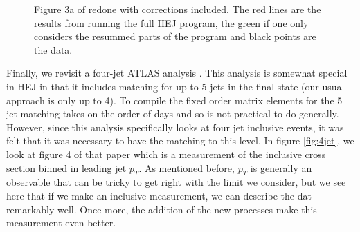 \begin{figure}[t]
\caption{Figure 3a of \cite{Aad2014} redone with corrections included. The red lines are the results from running the full HEJ program, the green if one only considers the resummed parts of the program and black points are the data.}
\label{fig:newveto3a}
\end{figure}

Finally, we revisit a four-jet ATLAS analysis \cite{Aad2015}. This analysis is somewhat special in HEJ in that it includes matching for up to 5 jets in the final state (our usual approach is only up to 4). To compile the fixed order matrix elements for the 5 jet matching takes on the order of days and so is not practical to do generally. However, since this analysis specifically looks at four jet inclusive events, it was felt that it was necessary to have the matching to this level. In figure \ref{fig:4jet}, we look at figure 4 of that paper which is a measurement of the inclusive cross section binned in leading jet $p_T$. As mentioned before, $p_T$ is generally an observable that can be tricky to get right with the limit we consider, but we see here that if we make an inclusive measurement, we can describe the dat remarkably well. Once more, the addition of the new processes make this measurement even better. 

